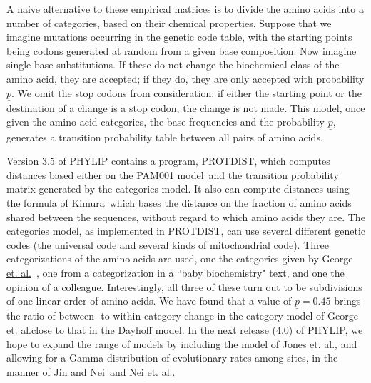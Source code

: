 \documentclass[12pt]{article}
\def\ul{\underline}
\def\fn{\footnotemark\ }
\begin{document}
A naive alternative to these empirical matrices is to divide the amino
acids into a number of categories, based on their chemical properties.
Suppose that we imagine mutations occurring in the genetic code table, with
the starting points being codons generated at random from a given base
composition.  Now imagine single base substitutions.  If these do not
change the biochemical class of the amino acid, they are accepted; if they
do, they are only accepted with probability $\ul{p}$.  We omit the stop codons
from consideration: if either the starting point or the destination of a
change is a stop codon, the change is not made.  This model, once given the
amino acid categories,
the base frequencies and the probability $\ul{p}$, generates a transition probability
table between all pairs of amino acids.

Version 3.5 of PHYLIP contains a program, PROTDIST, which computes distances
based either on the PAM001 model\footnotemark[13]\  and the transition probability matrix
generated by the categories model.  It also can
compute distances using the formula of Kimura\fn which bases the distance
on the fraction of amino acids shared between the sequences, without regard to
which amino acids they are.  The categories model, as implemented in PROTDIST,
can use several different genetic codes (the universal code and several kinds
of mitochondrial code).  Three categorizations of the amino acids are used,
one the categories given by George \ul{et. al.}\fn, one from a categorization
in a ``baby biochemistry" text, and one the opinion of a colleague.  Interestingly, all three of these turn out to be subdivisions of one linear order of amino
acids.  We have
found that a value of $\ul{p} = 0.45$ brings the ratio of between- to within-category
change in the category model of George \ul{et. al.}\footnotemark[19] close to that in the Dayhoff model.  In the next release (4.0) of
PHYLIP, we hope to expand the range of models by including the 
model of Jones \ul{et. al.}\footnotemark[14], and allowing for a Gamma distribution of evolutionary rates among
sites, in the manner of Jin and Nei\fn and Nei \ul{et. al.}\footnotemark.
\end{document}
